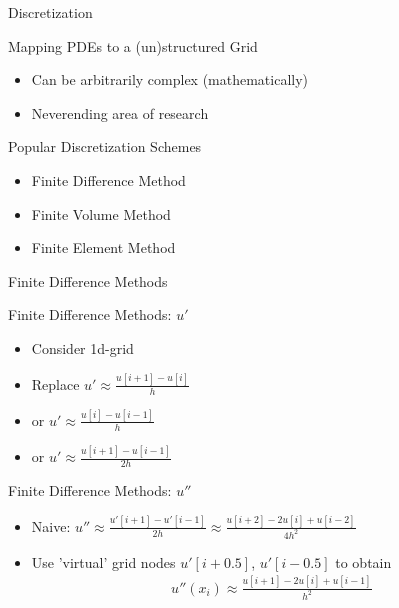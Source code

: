 
\begin{frame}{Discretization}
 
 \begin{block}{Mapping PDEs to a (un)structured Grid}
   \begin{itemize}
    \item Can be arbitrarily complex (mathematically)
    \item Neverending area of research
   \end{itemize}
 \end{block}
 
 \begin{block}{Popular Discretization Schemes}
   \begin{itemize}
    \item Finite Difference Method
    \item Finite Volume Method
    \item Finite Element Method
   \end{itemize}
 \end{block}
 
\end{frame}


\begin{frame}{Finite Difference Methods}
 
 \begin{block}{Finite Difference Methods: $u'$}
   \begin{itemize}
    \item Consider 1d-grid
    \item Replace $u' \approx \frac{u[i+1] - u[i]}{h}$
    \item or $u' \approx \frac{u[i] - u[i-1]}{h}$
    \item or $u' \approx \frac{u[i+1] - u[i-1]}{2h}$
   \end{itemize}
 \end{block}
 
 \begin{block}{Finite Difference Methods: $u''$}
   \begin{itemize}
    \item Naive: $u'' \approx \frac{u'[i+1] - u'[i-1]}{2h} \approx \frac{u[i+2] - 2u[i] + u[i-2]}{4h^2}$
    \item Use 'virtual' grid nodes $u'[i+0.5]$, $u'[i-0.5]$ to obtain
      \begin{align*}
        u''(x_i) \approx \frac{u[i+1] - 2u[i] + u[i-1]}{h^2}
      \end{align*}
   \end{itemize}
 \end{block}
 

 
\end{frame}



